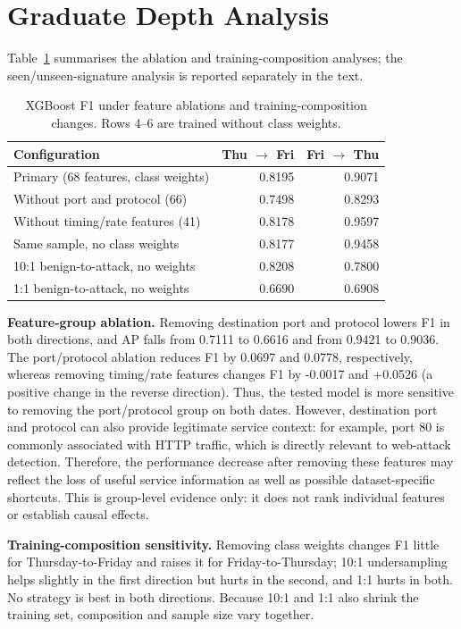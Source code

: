 \documentclass{article}
\begin{document}
\section{Graduate Depth Analysis}
Table~\ref{tab:depth} summarises the ablation and training-composition analyses; the seen/unseen-signature analysis is reported separately in the text.
\begin{table}[t]
\centering
\caption{XGBoost F1 under feature ablations and training-composition changes. Rows 4--6 are trained without class weights.}
\label{tab:depth}
\begin{tabular}{lrr}
\toprule
Configuration & Thu $\rightarrow$ Fri & Fri $\rightarrow$ Thu \\
\midrule
Primary (68 features, class weights) & 0.8195 & 0.9071 \\
Without port and protocol (66) & 0.7498 & 0.8293 \\
Without timing/rate features (41) & 0.8178 & 0.9597 \\
Same sample, no class weights & 0.8177 & 0.9458 \\
10:1 benign-to-attack, no weights & 0.8208 & 0.7800 \\
1:1 benign-to-attack, no weights & 0.6690 & 0.6908 \\
\bottomrule
\end{tabular}
\end{table}

\textbf{Feature-group ablation.} Removing destination port and protocol lowers F1 in both directions, and AP falls from 0.7111 to 0.6616 and from 0.9421 to 0.9036. The port/protocol ablation reduces F1 by 0.0697 and 0.0778, respectively, whereas removing timing/rate features changes F1 by -0.0017 and +0.0526 (a positive change in the reverse direction). Thus, the tested model is more sensitive to removing the port/protocol group on both dates. However, destination port and protocol can also provide legitimate service context: for example, port 80 is commonly associated with HTTP traffic, which is directly relevant to web-attack detection. Therefore, the performance decrease after removing these features may reflect the loss of useful service information as well as possible dataset-specific shortcuts. This is group-level evidence only: it does not rank individual features or establish causal effects.

\textbf{Training-composition sensitivity.} Removing class weights changes F1 little for Thursday-to-Friday and raises it for Friday-to-Thursday; 10:1 undersampling helps slightly in the first direction but hurts in the second, and 1:1 hurts in both. No strategy is best in both directions. Because 10:1 and 1:1 also shrink the training set, composition and sample size vary together.
\end{document}
